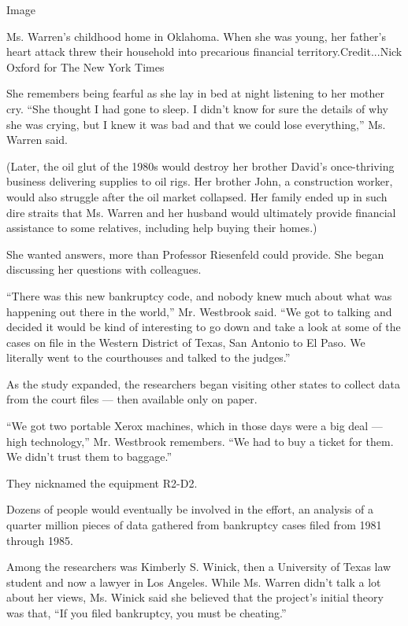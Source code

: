 Image

Ms. Warren's childhood home in Oklahoma. When she was young, her
father's heart attack threw their household into precarious financial
territory.Credit...Nick Oxford for The New York Times

She remembers being fearful as she lay in bed at night listening to her
mother cry. ``She thought I had gone to sleep. I didn't know for sure
the details of why she was crying, but I knew it was bad and that we
could lose everything,'' Ms. Warren said.

(Later, the oil glut of the 1980s would destroy her brother David's
once-thriving business delivering supplies to oil rigs. Her brother
John, a construction worker, would also struggle after the oil market
collapsed. Her family ended up in such dire straits that Ms. Warren and
her husband would ultimately provide financial assistance to some
relatives, including help buying their homes.)

She wanted answers, more than Professor Riesenfeld could provide. She
began discussing her questions with colleagues.

``There was this new bankruptcy code, and nobody knew much about what
was happening out there in the world,'' Mr. Westbrook said. ``We got to
talking and decided it would be kind of interesting to go down and take
a look at some of the cases on file in the Western District of Texas,
San Antonio to El Paso. We literally went to the courthouses and talked
to the judges.''

As the study expanded, the researchers began visiting other states to
collect data from the court files --- then available only on paper.

``We got two portable Xerox machines, which in those days were a big
deal --- high technology,'' Mr. Westbrook remembers. ``We had to buy a
ticket for them. We didn't trust them to baggage.''

They nicknamed the equipment R2-D2.

Dozens of people would eventually be involved in the effort, an analysis
of a quarter million pieces of data gathered from bankruptcy cases filed
from 1981 through 1985.

Among the researchers was Kimberly S. Winick, then a University of Texas
law student and now a lawyer in Los Angeles. While Ms. Warren didn't
talk a lot about her views, Ms. Winick said she believed that the
project's initial theory was that, ``If you filed bankruptcy, you must
be cheating.''

